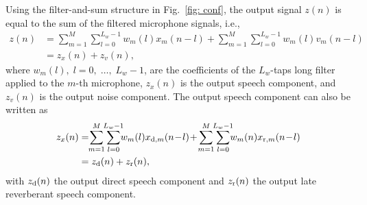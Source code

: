 \documentclass[10pt]{IEEEtran}
\begin{document}
Using the filter-and-sum structure in Fig.~\ref{fig: conf}, the output signal $z(n)$ is equal to the sum of the filtered microphone signals, i.e.,
\begin{align}
  z(n) & =\!\! \sum_{m=1}^{M}\!\! \sum_{l=0}^{L_w-1}  w_m(l)x_m(n-l) + \sum_{m=1}^{M} \!\! \sum_{l=0}^{L_w-1}w_m(l)v_m(n-l) \nonumber \\
  \label{eq: outcomp}
  & = z_x(n) + z_v(n),
\end{align}
where $w_m(l), \; l = 0, \; \ldots, \; L_w-1$, are the coefficients of the $L_w$-taps long filter applied to the $m$-th microphone, $z_x(n)$ is the output speech component, and $z_v(n)$ is the output noise component.
The output speech component can also be written as
\begin{align}
z_x(n) & = \!\!\sum_{m=1}^{M}\!\! \sum_{l=0}^{L_w-1} \!\!\!w_m(l)x_{{\rm{d}},m}(n\!-\!l)\! + \!\sum_{m=1}^{M}\!\! \sum_{l=0}^{L_w-1}\!\!\! w_m(n)x_{{\rm{r}},m}(n\!-\!l) \nonumber  \\
\label{eq: zxdzxr}
& = z_{\rm{d}}(n) + z_{\rm{r}}(n),
\end{align}
with $z_{\rm{d}}(n)$ the output direct speech component and $z_{\rm{r}}(n)$ the output late reverberant speech component.
\end{document}
